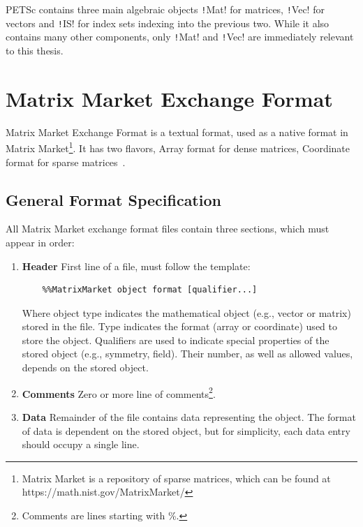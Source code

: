 \documentclass[thesis=M,english]{FITthesis}[2019/12/23]
\newcommand{\csre}[1]{\texttt!#1!}
\begin{document}
PETSc contains three main algebraic objects \csre{Mat} for matrices, \csre{Vec} for vectors and \csre{IS}
for index sets indexing into the previous two. While it also contains many other components, only \csre{Mat}
and \csre{Vec} are immediately relevant to this thesis.


\section{Matrix Market Exchange Format}\label{theory:MMEF}

Matrix Market Exchange Format is a textual format, used as a native format in Matrix Market\footnote{
    Matrix Market is a repository of sparse matrices, which can be found at https://math.nist.gov/MatrixMarket/
}.
It has two flavors, Array format for dense matrices, Coordinate format for sparse matrices~\cite{mmef}.


\subsection{General Format Specification}

All Matrix Market exchange format files contain three sections, which must appear in order:

\begin{enumerate}
    \item \textbf{Header} First line of a file, must follow the template:
          \begin{lstlisting}
    %%MatrixMarket object format [qualifier...]
\end{lstlisting}
          Where object type indicates the mathematical object (e.g., vector or matrix)
          stored in the file. Type indicates the format (array or coordinate) used to store
          the object. Qualifiers are used to indicate special properties of the stored
          object (e.g., symmetry, field). Their number, as well as allowed values, depends on
          the stored object.
    \item \textbf{Comments} Zero or more line of comments\footnote{Comments are lines starting with \%.}.
    \item \textbf{Data} Remainder of the file contains data representing the object.
          The format of data is dependent on the stored object, but for simplicity,
          each data entry should occupy a single line.
\end{enumerate}
\end{document}
